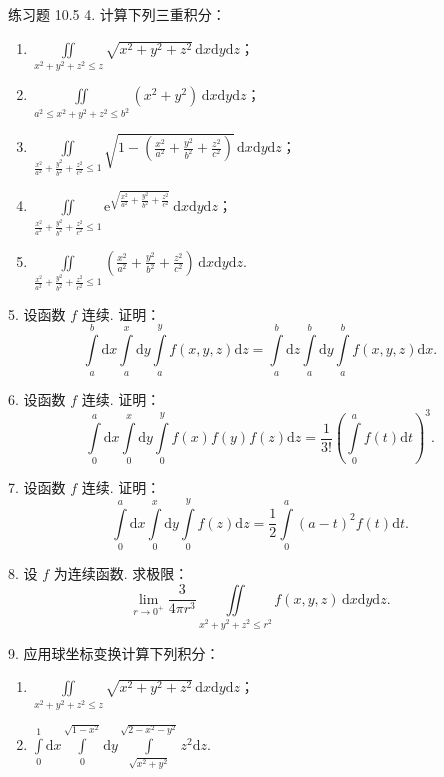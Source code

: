 \begin{exblock}{练习题 10.5}
4. 计算下列三重积分：
\begin{enumerate}
  \item $\displaystyle \iint \limits_{x^2 + y^2 + z^2 \leqslant z} \sqrt{x^2 + y^2 + z^2} \, \mathrm{d}x \mathrm{d}y \mathrm{d}z$；
  \item $\displaystyle \iint \limits_{a^2 \leqslant x^2 + y^2 + z^2 \leqslant b^2} (x^2 + y^2) \, \mathrm{d}x \mathrm{d}y \mathrm{d}z$；
  \item $\displaystyle \iint \limits_{\frac{x^2}{a^2} + \frac{y^2}{b^2} + \frac{z^2}{c^2} \leqslant 1} \sqrt{1 - \left( \frac{x^2}{a^2} + \frac{y^2}{b^2} + \frac{z^2}{c^2} \right)} \, \mathrm{d}x \mathrm{d}y \mathrm{d}z$；
  \item $\displaystyle \iint \limits_{\frac{x^2}{a^2} + \frac{y^2}{b^2} + \frac{z^2}{c^2} \leqslant 1} \mathrm{e}^{\sqrt{\frac{x^2}{a^2} + \frac{y^2}{b^2} + \frac{z^2}{c^2}}} \, \mathrm{d}x \mathrm{d}y \mathrm{d}z$；
  \item $\displaystyle \iint \limits_{\frac{x^2}{a^2} + \frac{y^2}{b^2} + \frac{z^2}{c^2} \leqslant 1} \left( \frac{x^2}{a^2} + \frac{y^2}{b^2} + \frac{z^2}{c^2} \right) \, \mathrm{d}x \mathrm{d}y \mathrm{d}z$.
\end{enumerate}

5. 设函数 $f$ 连续. 证明：
\[
\int \limits_a^b \mathrm{d}x \int \limits_a^x \mathrm{d}y \int \limits_a^y f(x, y, z) \mathrm{d}z
= \int \limits_a^b \mathrm{d}z \int \limits_a^b \mathrm{d}y \int \limits_a^b f(x, y, z) \mathrm{d}x.
\]

6. 设函数 $f$ 连续. 证明：
\[
\int \limits_0^a \mathrm{d}x \int \limits_0^x \mathrm{d}y \int \limits_0^y
  f(x) f(y) f(z) \mathrm{d}z = \frac{1}{3!} \left( \int \limits_0^a f(t) \mathrm{d}t \right)^3.
\]

7. 设函数 $f$ 连续. 证明：
\[
\int \limits_0^a \mathrm{d}x \int \limits_0^x \mathrm{d}y \int \limits_0^y f(z) \mathrm{d}z
= \frac{1}{2} \int \limits_0^a (a - t)^2 f(t) \mathrm{d}t.
\]

8. 设 $f$ 为连续函数. 求极限：
\[
\lim_{r \to 0^+} \frac{3}{4 \pi r^3} \iint \limits_{x^2 + y^2 + z^2 \leqslant r^2}
  f(x, y, z) \, \mathrm{d}x \mathrm{d}y \mathrm{d}z.
\]

9. 应用球坐标变换计算下列积分：
\begin{enumerate}
  \item $\displaystyle \iint \limits_{x^2 + y^2 + z^2 \leqslant z} \sqrt{x^2 + y^2 + z^2} \, \mathrm{d}x \mathrm{d}y \mathrm{d}z$；
  \item $\displaystyle \int \limits_0^1 \mathrm{d}x \int \limits_0^{\sqrt{1 - x^2}} \mathrm{d}y
    \int \limits_{\sqrt{x^2 + y^2}}^{\sqrt{2 - x^2 - y^2}} z^2 \mathrm{d}z$.
\end{enumerate}


\end{exblock}

